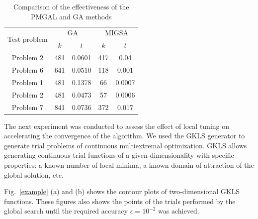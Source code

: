 \documentclass[
11pt,%
tightenlines,%
twoside,%
onecolumn,%
nofloats,%
nobibnotes,%
nofootinbib,%
superscriptaddress,%
noshowpacs,%
centertags]%
{revtex4}
\begin{document}
\begin{table}
	\caption{Comparison of the effectiveness of the PMGAL and GA methods}
	\label{tab:1}
	\center
	\begin{tabular}{|c|c|c|c|c|}
		\hline
	\multirow{2}{*}{Test problem}	 & \multicolumn{2}{c|}{ GA } &  \multicolumn{2}{c|}{MIGSA} \\
		\cline{2-3} \cline{4-5} 
		 & $k$ & $t$ &  $k$ & $t$  \\
		\hline 
		 Problem 2 \cite{Floudas}&	481 &	0.0601 & 	417 &	0.04 \\
		 Problem 6 \cite{Floudas}&	641 &	0.0510 & 	118 &	0.001 \\
		 Problem 1 \cite{Deep}   &	481 &	0.1378 & 	66 &	0.0007 \\
		 Problem 2 \cite{Deep}   &	481 &	0.0473 & 	57 &	0.0006 \\
		 Problem 7 \cite{Deep}   &	841 &	0.0736 &  372	 &	0.017 \\
		\hline
	\end{tabular}
\end{table}	


The next experiment was conducted to assess the effect of local tuning on accelerating the convergence of the algorithm. We used the GKLS generator \cite{Gaviano} to generate trial problems of continuous multiextremal optimization. GKLS allows generating continuous trial functions of a given dimensionality with specific properties: a known number of local minima, a known domain of attraction of the global solution, etc.  

Fig.~\ref{example} (a) and (b) shows the contour plots of two-dimensional GKLS functions. These figures also shows the points of the trials performed by the global search until the required accuracy $\epsilon=10^{-2}$ was achieved.
\end{document}
